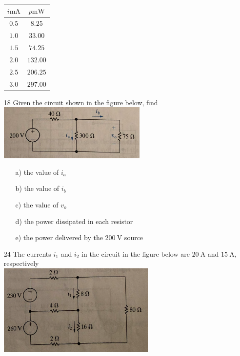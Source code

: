 \documentclass[a4paper]{article}
\begin{document}
\begin{itemize}
	      \begin{tabular}{|c|c|}
	      	\hline
	      	$i\si{\milli\ampere}$ & $p\si{\milli\watt}$ \\
	      	\hline
	      	$0.5$                 & $8.25$              \\
	      	\hline
	      	$1.0$                 & $33.00$             \\
	      	\hline
	      	$1.5$                 & $74.25$             \\
	      	\hline
	      	$2.0$                 & $132.00$            \\
	      	\hline
	      	$2.5$                 & $206.25$            \\
	      	\hline
	      	$3.0$                 & $297.00$            \\
	      	\hline
	      \end{tabular}
	\item[18] Given the circuit shown in the figure below, find \\
	      \includegraphics{P2-18.png} \\	  
	      \begin{itemize}
	      	\item[a)] the value of $i_{a}$
	      	\item[b)] the value of $i_{b}$
	      	\item[c)] the value of $v_{o}$
	      	\item[d)] the power dissipated in each resistor
	      	\item[e)] the power delivered by the $\SI{200}{\volt}$ source    
	      \end{itemize}
	\item[24] The currents $i_{1}$ and $i_{2}$ in the circuit in the figure below are $\SI{20}{\ampere}$ and $\SI{15}{\ampere}$, respectively \\
	      \includegraphics{P2-24.png} \\	  

\end{itemize}
\end{document}
